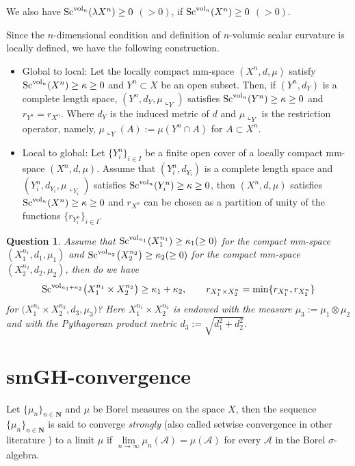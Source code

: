 \documentclass[pdftex]{sigma}
\newtheorem{Question}[Theorem]{Question}
\begin{document}
We also have ${\rm Sc}^{{\rm vol}_n}(\lambda X^n)\geq 0$ $(>0)$, if ${\rm Sc}^{{\rm vol}_n}(X^n)\geq 0$ $(>0)$.

\begin{Remark}Since the $n$-dimensional condition and definition of $n$-volumic scalar curvature is locally defined, we have the following construction.
\begin{itemize}\itemsep=0pt
\item Global to local: Let the locally compact mm-space $(X^n, d, \mu)$ satisfy ${\rm Sc}^{{\rm vol}_n}(X^n)\geq \kappa\geq 0$ and $Y^n\subset X$ be an open subset. Then, if $(Y^n,d_Y)$ is a complete length space, $(Y^n,d_Y,\mu\llcorner_Y)$ satisfies ${\rm Sc}^{{\rm vol}_n}(Y^n)\geq \kappa\geq 0$ and $r_{Y^n}=r_{X^n}$. Where $d_Y$ is the induced metric of $d$ and $\mu\llcorner_Y$ is the restriction operator, namely, $\mu\llcorner_Y(A):=\mu(Y^n\cap A)$ for $A\subset X^n$.

\item Local to global: Let $\{Y^n_i\}_{i\in I}$ be a finite open cover of a locally compact mm-space $(X^n, d, \mu)$. Assume that $(Y^n_i,d_{Y_i})$ is a complete length space and $(Y^n_i,d_{Y_i},\mu\llcorner_{Y_i})$ satisfies ${\rm Sc}^{{\rm vol}_n}(Y^n_i)\geq \kappa\geq 0$, then $(X^n, d, \mu)$ satisfies ${\rm Sc}^{{\rm vol}_n}(X^n)\geq \kappa\geq 0$ and $r_{X^n}$ can be chosen as a partition of unity of the functions $\{r_{Y^n_i}\}_{i\in I}$.
\end{itemize}
\end{Remark}

\begin{Question}Assume that ${\rm Sc}^{{\rm vol}_{n_1}}(X^{n_1}_1)\geq \kappa_1 (\geq 0)$ for the compact mm-space $(X^{n_1}_1, d_1, \mu_1)$ and ${\rm Sc}^{{\rm vol}_{n_2}} \big(X^{n_2}_2 \big)\geq \kappa_2 (\geq 0)$ for the compact mm-space $(X^{n_2}_2, d_2, \mu_2)$, then do we have
 \begin{gather*}
 {\rm Sc}^{{\rm vol}_{n_1+n_2}} \big(X^{n_1}_1\times X^{n_2}_2 \big)\geq \kappa_1+\kappa_2, \qquad r_{X^n_1 \times X^n_2}=\min \{r_{X^n_1},r_{X^n_2}\}
 \end{gather*}
 for $ \big(X^{n_1}_1\times X^{n_2}_2, d_3, \mu_3 \big)$? Here $X^{n_1}_1 \times X^{n_2}_2$ is endowed with the measure $\mu_3:= \mu_1 \otimes \mu_2$ and with the Pythagorean product metric $d_3 :=\sqrt{d_1^2+d_2^2}$.
\end{Question}

\section{smGH-convergence}\label{sm}
 Let $\{\mu_n\}_{n\in\mathbf{N}}$ and $\mu$ be Borel measures on the space $X$, then the sequence $\{\mu_n\}_{n\in\mathbf{N}}$ is said to converge \textit{strongly} (also called setwise convergence in other literature ) to a limit $\mu$ if $\lim\limits_{n\rightarrow \infty} \mu_n(\mathcal{A})=\mu(\mathcal{A})$ for every $\mathcal{A}$ in the Borel $\sigma$-algebra.
\end{document}
